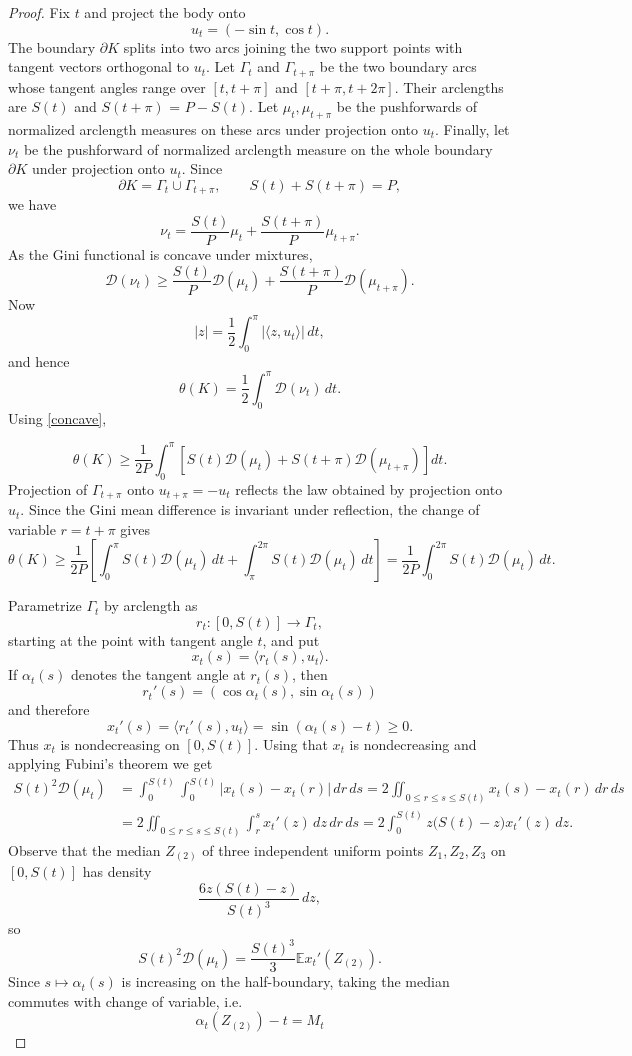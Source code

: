 \documentclass[final,12pt]{elsarticle}
\numberwithin{equation}{section}
\theoremstyle{remark}
\newcommand{\E}{\mathbb E}
\newcommand{\Gini}{\mathcal D}
\theoremstyle{definition}
\begin{document}
\begin{proof}
Fix $t$ and project the body onto
$$
    u_t=(-\sin t,\cos t).
$$
The boundary $\partial K$ splits into two arcs joining the two support points with tangent vectors orthogonal to $u_t$. Let $\Gamma_t$ and $\Gamma_{t+\pi}$ be the two boundary arcs whose tangent angles range over $[t, t+\pi]$ and $[t+\pi, t+2\pi]$. Their arclengths are $S(t)$ and $S(t+\pi)$ = $P-S(t)$. Let $\mu_t, \mu_{t+\pi}$ be the pushforwards of normalized arclength measures on these arcs under projection onto $u_t$. Finally, let \(\nu_t\) be the pushforward of normalized arclength measure on the whole boundary \(\partial K\) under projection onto \(u_t\). Since
$$
\partial K=\Gamma_t\cup\Gamma_{t+\pi},
\qquad
S(t)+S(t+\pi)=P,
$$
we have
$$
\nu_t
=
\frac{S(t)}{P}\mu_t
+
\frac{S(t+\pi)}{P}\mu_{t+\pi}.
$$
As the Gini functional is concave under mixtures, 
\begin{equation}\label{concave}
\Gini(\nu_t)\ge\frac{S(t)}{P}\Gini(\mu_t)+\frac{S(t+\pi)}{P}\Gini(\mu_{t+\pi}).\end{equation}
Now
$$
|z|
=
\frac12\int_0^\pi
|\langle z,u_t\rangle|\,dt,
$$
and hence
$$
\theta(K)
=
\frac12\int_0^\pi \Gini(\nu_t)\,dt.
$$
Using \ref{concave},

$$\theta(K) \ge\frac1{2P}\int_0^\pi\left[S(t)\Gini(\mu_t)+S(t+\pi)\Gini(\mu_{t+\pi})\right]dt.$$
Projection of $\Gamma_{t+\pi}$ onto $u_{t+\pi}=-u_t$ reflects the
law obtained by projection onto $u_t$. Since the Gini mean difference
is invariant under reflection, the change of variable $r=t+\pi$ gives
\begin{equation}\label{theta_lower_bound}\theta(K) \geq \frac1{2P}\left[\int_0^\pi S(t)\Gini(\mu_t)\,dt+\int_\pi^{2\pi}S(t)\Gini(\mu_t)\,dt\right]=\frac1{2P}\int_0^{2\pi}S(t)\Gini(\mu_t)\,dt.
\end{equation}


Parametrize $\Gamma_t$ by arclength as
$$
r_t:[0,S(t)]\longrightarrow \Gamma_t,
$$
starting at the point with tangent angle $t$, and put
$$
x_t(s)=\langle r_t(s),u_t\rangle.
$$
If $\alpha_t(s)$ denotes the tangent angle at $r_t(s)$, then
$$
r_t'(s)=(\cos\alpha_t(s),\sin\alpha_t(s))
$$
and therefore
$$
x_t'(s)
=
\langle r_t'(s),u_t\rangle
=
\sin(\alpha_t(s)-t)\ge0.
$$
Thus $x_t$ is nondecreasing on $[0,S(t)]$.  Using that $x_t$ is
nondecreasing and applying Fubini's theorem we get
\begin{equation}\label{eq:chain-energy}
\begin{aligned}
    S(t)^2\Gini(\mu_t)
    &=\int_0^{S(t)}\int_0^{S(t)}
       |x_t(s)-x_t(r)|\,dr\,ds = 2\iint_{0\leq r\leq s \leq S(t)} x_t(s)-x_t(r)\,dr\,ds \\
    &=2\iint_{0\leq r\leq s \leq S(t)} \int_r^s x_t'(z)\,dz\,dr\,ds=2\int_0^{S(t)}z\bigl(S(t)-z\bigr)x_t'(z)\,dz.
\end{aligned}
\end{equation}
Observe that the median $Z_{(2)}$ of three independent uniform points $Z_1, Z_2,Z_3$ on $[0,S(t)]$ has density
$$
    \frac{6z(S(t)-z)}{S(t)^3}\,dz,
$$
so
$$S(t)^2\Gini(\mu_t) = \frac{S(t)^3}{3} \E x_t'(Z_{(2)}).$$ Since $s \mapsto \alpha_t(s)$ is increasing on the half-boundary, taking the median commutes with change of variable, i.e.
$$\alpha_t(Z_{(2)}) - t  = M_t$$


\end{proof}
\end{document}
